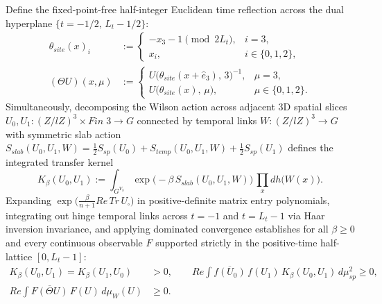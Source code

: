 \documentclass[american,11pt,letterpaper]{article}
\def\mathbb#1{#1}%
\def\mathbf#1{#1}%
\def\mathrm#1{#1}%
\begin{document}
Define the fixed-point-free half-integer Euclidean time reflection across the dual hyperplane $\{t = -1/2,\, L_t - 1/2\}$:
\begin{align}
\theta_{\mathrm{site}}(x)_i &:= \begin{cases}
  -x_3 - 1 \pmod{2 L_t}, & i = 3,\\
  x_i, & i \in \{0,1,2\},
\end{cases}
\nonumber\\[0.3em]
(\Theta U)(x,\mu) &:= \begin{cases}
  U\bigl(\theta_{\mathrm{site}}(x + \hat{e}_3),\,3\bigr)^{-1}, & \mu = 3,\\
  U\bigl(\theta_{\mathrm{site}}(x),\,\mu\bigr), & \mu \in \{0,1,2\}.
\end{cases}
\label{eq:os_time_reflection_def}
\end{align}
Simultaneously, decomposing the Wilson action across adjacent 3D spatial slices $U_0, U_1 : (\mathbb{Z}/l\mathbb{Z})^3 \times \mathrm{Fin}\;3 \to G$ connected by temporal links $W : (\mathbb{Z}/l\mathbb{Z})^3 \to G$ with symmetric slab action $S_{\mathrm{slab}}(U_0,U_1,W) = \frac{1}{2}S_{\mathrm{sp}}(U_0) + S_{\mathrm{temp}}(U_0,U_1,W) + \frac{1}{2}S_{\mathrm{sp}}(U_1)$ defines the integrated transfer kernel
\begin{equation}
K_\beta(U_0, U_1) := \int_{G^{V_3}} \exp\bigl(-\beta\,S_{\mathrm{slab}}(U_0, U_1, W)\bigr)\,\prod_{\mathbf{x}} dh\bigl(W(\mathbf{x})\bigr).
\label{eq:slab_transfer_kernel}
\end{equation}
Expanding $\exp\bigl(\frac{\beta}{n+1}\mathrm{Re}\,\mathrm{Tr}\,U_\square\bigr)$ in positive-definite matrix entry polynomials, integrating out hinge temporal links across $t = -1$ and $t = L_t - 1$ via Haar inversion invariance, and applying dominated convergence establishes for all $\beta \ge 0$ and every continuous observable $F$ supported strictly in the positive-time half-lattice $[0, L_t - 1]$:
\begin{align}
K_\beta(U_0, U_1) = K_\beta(U_1, U_0) &> 0,
\qquad
\mathrm{Re}\int \overline{f(U_0)}\,f(U_1)\,K_\beta(U_0,U_1)\,d\mu_{\mathrm{sp}}^2 \ge 0,
\nonumber\\
\mathrm{Re}\int \overline{F(\Theta U)}\,F(U)\,d\mu_W(U) &\ge 0.
\label{eq:os_reflection_positivity_ineq}
\end{align}
\end{document}
